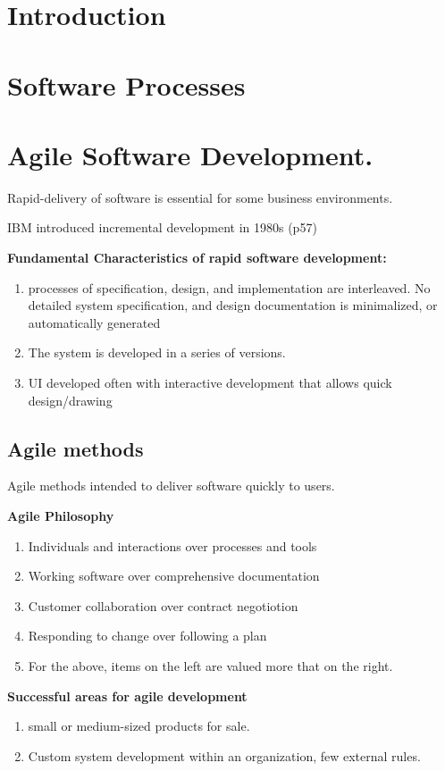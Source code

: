 \documentclass{article}
\begin{document}
\section{Introduction}
\section{Software Processes}
\section{Agile Software Development.}

Rapid-delivery of software is essential for some business environments.  

IBM introduced incremental development in 1980s (p57)

\textbf{Fundamental Characteristics of rapid software development:}
    \begin{enumerate}
        \item processes of specification, design, and implementation are interleaved.
        No detailed system specification, and design documentation is minimalized, or automatically generated
    \item The system is developed in a series of versions.
    \item UI developed often with interactive development that allows quick design/drawing
    \end{enumerate}

\subsection{Agile methods}

Agile methods intended to deliver software quickly to users.

\textbf{Agile Philosophy}
\begin{enumerate}
    \item Individuals and interactions over processes and tools
    \item Working software over comprehensive documentation
    \item Customer collaboration over contract negotiotion
    \item Responding to change over following a plan
    \item For the above, items on the left are valued more that on the right.
\end{enumerate}

\textbf{Successful areas for agile development}
\begin{enumerate}
    \item small or medium-sized products for sale.
    \item Custom system development within an organization, few external rules.
\end{enumerate}
\end{document}
